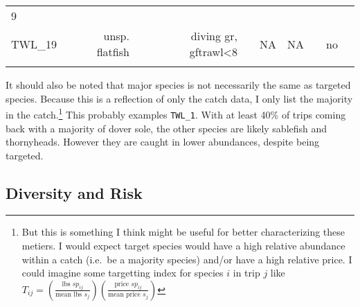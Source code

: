 \documentclass[]{article}
\begin{document}
\begin{longtable}[c]{@{}lrrcccccc@{}}
\begin{minipage}[t]{0.08\columnwidth}
9
\end{minipage}
\\\addlinespace
\begin{minipage}[t]{0.07\columnwidth}\raggedright
TWL\_19
\end{minipage} & \begin{minipage}[t]{0.19\columnwidth}\raggedleft
unsp. flatfish
\end{minipage} & \begin{minipage}[t]{0.16\columnwidth}\raggedleft
diving gr, gftrawl\textless{}8
\end{minipage} & \begin{minipage}[t]{0.04\columnwidth}\centering
100
\end{minipage} & \begin{minipage}[t]{0.04\columnwidth}\centering
NA
\end{minipage} & \begin{minipage}[t]{0.04\columnwidth}\centering
NA
\end{minipage} & \begin{minipage}[t]{0.06\columnwidth}\centering
1
\end{minipage} & \begin{minipage}[t]{0.08\columnwidth}\centering
no
\end{minipage} & \begin{minipage}[t]{0.08\columnwidth}\centering
1
\end{minipage}
\\\addlinespace
\bottomrule
\end{longtable}

It should also be noted that major species is not necessarily the same
as targeted species. Because this is a reflection of only the catch
data, I only list the majority in the catch.\footnote{But this is
  something I think might be useful for better characterizing these
  metiers. I would expect target species would have a high relative
  abundance within a catch (i.e.~be a majority species) and/or have a
  high relative price. I could imagine some targetting index for species
  $i$ in trip $j$ like
  $T_{ij} = \left(\frac{\text{lbs }sp_{ij}}{\text{mean lbs } s_j}\right)\left(\frac{\text{price }sp_{ij}}{\text{mean price }s_j}\right)$}
This probably examples \texttt{TWL\_1}. With at least 40\% of trips
coming back with a majority of dover sole, the other species are likely
sablefish and thornyheads. However they are caught in lower abundances,
despite being targeted.

\subsection{Diversity and Risk}\label{diversity-and-risk}
\end{document}
